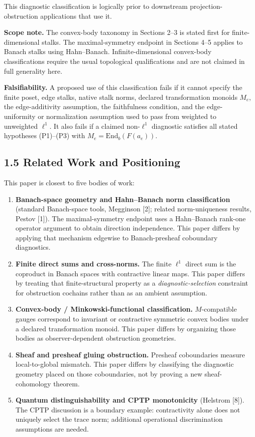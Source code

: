 \documentclass[
  11pt,
]{article}
\providecommand{\tightlist}{%
  \setlength{\itemsep}{0pt}\setlength{\parskip}{0pt}}
\providecommand{\tightlist}{%
  \setlength{\itemsep}{0pt}\setlength{\parskip}{0pt}}
\begin{document}
This diagnostic classification is logically prior to downstream projection-obstruction applications that use it.

\textbf{Scope note.} The convex-body taxonomy in Sections 2--3 is stated first for finite-dimensional stalks. The maximal-symmetry endpoint in Sections 4--5 applies to Banach stalks using Hahn--Banach. Infinite-dimensional convex-body classifications require the usual topological qualifications and are not claimed in full generality here.

\textbf{Falsifiability.} A proposed use of this classification fails if it cannot specify the finite poset, edge stalks, native stalk norms, declared transformation monoids \(M_e\), the edge-additivity assumption, the faithfulness condition, and the edge-uniformity or normalization assumption used to pass from weighted to unweighted \(\ell^1\). It also fails if a claimed non-\(\ell^1\) diagnostic satisfies all stated hypotheses (P1)--(P3) with \(M_e = \mathrm{End}_b(F(a_e))\).

\subsection{1.5 Related Work and Positioning}\label{related-work-and-positioning}

This paper is closest to five bodies of work:

\begin{enumerate}
\def\labelenumi{\arabic{enumi}.}
\tightlist
\item
  \textbf{Banach-space geometry and Hahn--Banach norm classification} (standard Banach-space tools, Megginson {[}2{]}; related norm-uniqueness results, Pestov {[}1{]}). The maximal-symmetry endpoint uses a Hahn--Banach rank-one operator argument to obtain direction independence. This paper differs by applying that mechanism edgewise to Banach-presheaf coboundary diagnostics.
\item
  \textbf{Finite direct sums and cross-norms.} The finite \(\ell^1\) direct sum is the coproduct in Banach spaces with contractive linear maps. This paper differs by treating that finite-structural property as a \emph{diagnostic-selection} constraint for obstruction cochains rather than as an ambient assumption.
\item
  \textbf{Convex-body / Minkowski-functional classification.} \(M\)-compatible gauges correspond to invariant or contractive symmetric convex bodies under a declared transformation monoid. This paper differs by organizing those bodies as observer-dependent obstruction geometries.
\item
  \textbf{Sheaf and presheaf gluing obstruction.} Presheaf coboundaries measure local-to-global mismatch. This paper differs by classifying the diagnostic geometry placed on those coboundaries, not by proving a new sheaf-cohomology theorem.
\item
  \textbf{Quantum distinguishability and CPTP monotonicity} (Helstrom {[}8{]}). The CPTP discussion is a boundary example: contractivity alone does not uniquely select the trace norm; additional operational discrimination assumptions are needed.
\end{enumerate}
\end{document}
